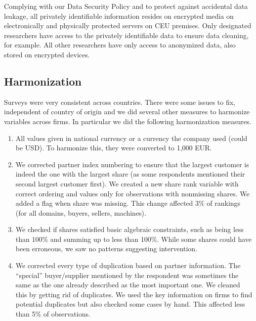 \documentclass[final, dvipsnames, authoryear,12pt]{elsarticle}
\begin{document}
Complying with our Data Security Policy and to protect against accidental data leakage, all privately identifiable information resides on encrypted media on electronically and physically protected servers on CEU premises. Only designated researchers have access to the privately identifiable data to ensure data cleaning, for example. All other researchers have only access to anonymized data, also stored on encrypted devices.


\subsection{Harmonization} 

Surveys were very consistent across countries. There were some issues to fix, independent of country of origin and we did several other measures to harmonize variables across firms. In particular we did the following harmonization measures.

\begin{enumerate}
    \item All values given in national currency or a currency the company used (could be USD). To harmonize this, they were converted to 1,000 EUR. 
    
    \item We corrected partner index numbering to ensure that the largest customer is indeed the one with the largest share (as some respondents mentioned their second largest customer first). We created a new share rank variable with correct ordering and values only for observations with nonmissing shares. We added a flag when share was missing. This change affected 3\% of rankings (for all domains, buyers, sellers, machines). 
    
    \item We checked if shares satisfied basic algebraic constraints, such as being less than 100\% and summing up to less than 100\%. While some shares could have been erroneous, we saw no patterns suggesting intervention.
    
    \item We corrected every type of duplication based on partner information. The ``special'' buyer/supplier mentioned by the respondent was sometimes the same as the one already described as the most important one. We cleaned this by getting rid of duplicates. We used the key information on firms to find potential duplicates but also checked some cases by hand. This affected less than 5\% of observations.

\end{enumerate}
\end{document}

